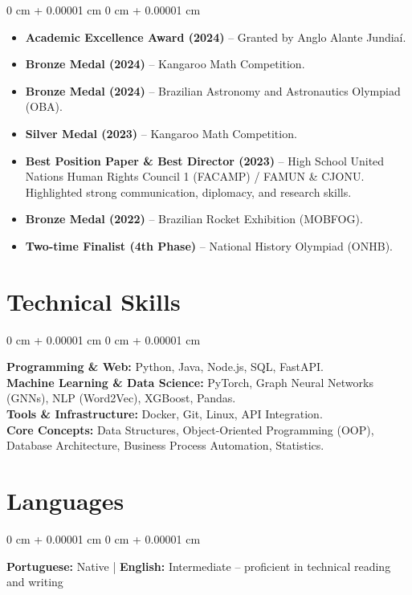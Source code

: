 \documentclass[10pt, letterpaper]{article}
\newenvironment{highlightsforbulletentries}{
    \begin{itemize}[
        topsep=0.10 cm,
        parsep=0.10 cm,
        partopsep=0pt,
        itemsep=0pt,
        leftmargin=10pt
    ]
}{
    \end{itemize}
} %
\newenvironment{onecolentry}{
    \begin{adjustwidth}{
        0 cm + 0.00001 cm
    }{
        0 cm + 0.00001 cm
    }
}{
    \end{adjustwidth}
} %
\begin{document}
\begin{onecolentry}
    \begin{highlightsforbulletentries}
        \item \textbf{Academic Excellence Award (2024)} -- Granted by Anglo Alante Jundiaí.
        \item \textbf{Bronze Medal (2024)} -- Kangaroo Math Competition.
        \item \textbf{Bronze Medal (2024)} -- Brazilian Astronomy and Astronautics Olympiad (OBA).
        \item \textbf{Silver Medal (2023)} -- Kangaroo Math Competition.
        \item \textbf{Best Position Paper \& Best Director (2023)} -- High School United Nations Human Rights Council 1 (FACAMP) / FAMUN \& CJONU. Highlighted strong communication, diplomacy, and research skills.
        \item \textbf{Bronze Medal (2022)} -- Brazilian Rocket Exhibition (MOBFOG).
        \item \textbf{Two-time Finalist (4th Phase)} -- National History Olympiad (ONHB).
    \end{highlightsforbulletentries}
\end{onecolentry}


\vspace{0.15 cm}
\section{Technical Skills}

\begin{onecolentry}
    \textbf{Programming \& Web:} Python, Java, Node.js, SQL, FastAPI. \\
    \textbf{Machine Learning \& Data Science:} PyTorch, Graph Neural Networks (GNNs), NLP (Word2Vec), XGBoost, Pandas. \\
    \textbf{Tools \& Infrastructure:} Docker, Git, Linux, API Integration. \\
    \textbf{Core Concepts:} Data Structures, Object-Oriented Programming (OOP), Database Architecture, Business Process Automation, Statistics.
\end{onecolentry}
\vspace{0.15 cm}
\section{Languages}

\begin{onecolentry}
    \textbf{Portuguese:} Native \hspace{0.5cm} | \hspace{0.5cm} \textbf{English:} Intermediate -- proficient in technical reading and writing
\end{onecolentry}
    
\end{document}
